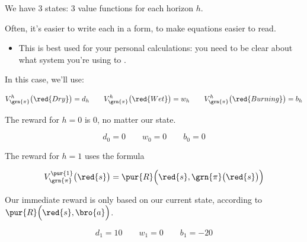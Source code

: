         We have 3 states: 3 value functions for each horizon $h$.\\

        \begin{notation}
            Often, it's easier to write each  in a  form, to make equations easier to read.

            \begin{itemize}
                \item This is best used for your personal calculations: you need to be clear about what system you're using to .
            \end{itemize}

            In this case, we'll use:

            \begin{equation*}
                V_{\grn{\pi}}^h\big(\red{Dry}\big) = d_h
                \qquad
                V_{\grn{\pi}}^h\big(\red{Wet}\big) = w_h
                \qquad
                V_{\grn{\pi}}^h\big(\red{Burning}\big) = b_h
            \end{equation*}
        \end{notation}

        \subsecdiv

        The reward for $h=0$ is 0, no matter our state.

        \begin{equation}
            d_0=0 \qquad w_0 = 0 \qquad b_0 = 0
        \end{equation}

        \subsecdiv

        The reward for $h=1$ uses the formula

        \begin{equation*}
            V_{\grn{\pi}}^{\pur{1}}\big(\red{s} \big) = 
                \pur{R} \Big( \red{s},\grn{\pi}\big(\red{s}\big) \Big)
        \end{equation*}

        Our immediate reward is only based on our current state, according to $\pur{R} \Big( \red{s},\bro{a} \Big)$.

        \begin{equation}
            d_1 = 10 \qquad w_1 = 0 \qquad b_1 = -20
        \end{equation}

